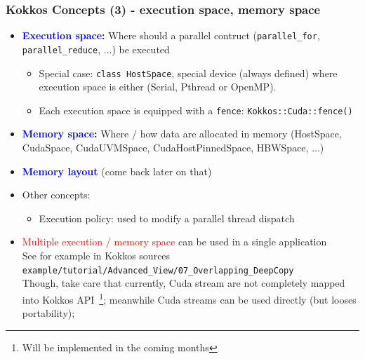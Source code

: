 \begin{frame}
  \frametitle{Kokkos Concepts (3) - execution space, memory space}

  \begin{itemize}
  \item \textcolor{blue}{\textbf{Execution space:}} Where should a parallel contruct (\texttt{parallel\_for}, \texttt{parallel\_reduce}, ...) be executed\\
    \begin{itemize}
    \item Special case: \texttt{class HostSpace}, special device (always defined) where execution space is either (Serial, Pthread or OpenMP).
    \item Each execution space is equipped with a \texttt{fence}: \texttt{Kokkos::Cuda::fence()}
    \end{itemize}
  \item \textcolor{blue}{\textbf{Memory space:}} Where / how data are allocated in memory (HostSpace, CudaSpace, CudaUVMSpace, CudaHostPinnedSpace, HBWSpace, ...)
  \item \textcolor{blue}{\textbf{Memory layout}} (come back later on that)
  \item Other concepts:
    \begin{itemize}
    \item Execution policy: used to modify a parallel thread dispatch
    \end{itemize}
  \item \textcolor{red}{Multiple execution / memory space} can be used in a single application\\
    See for example in Kokkos sources \texttt{example/tutorial/Advanced\_View/07\_Overlapping\_DeepCopy}\\
    Though, take care that currently, Cuda stream are not completely mapped into Kokkos API~\footnote{Will be implemented in the coming months}; meanwhile Cuda streams can be used directly (but looses portability); 
  \end{itemize}

\end{frame}

